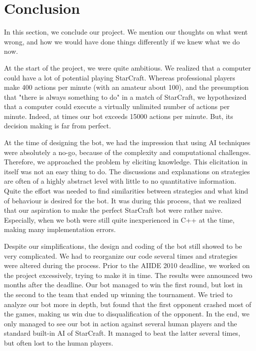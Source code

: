 
\chapter{Conclusion}
\label{chap:conclusion}

In this section, we conclude our project. We mention our thoughts on what went wrong, and how we would have done things differently if we knew what we do now.

At the start of the project, we were quite ambitious. We realized that a computer could have a lot of potential playing StarCraft. Whereas professional players make 400 actions per minute (with an amateur about 100), and the presumption that "there is always something to do" in a match of StarCraft, we hypothesized that a computer could execute a virtually unlimited number of actions per minute. Indeed, at times our bot exceeds 15000 actions per minute. But, its decision making is far from perfect. 

At the time of designing the bot, we had the impression that using AI techniques were absolutely a no-go, because of the complexity and computational challenges. Therefore, we approached the problem by eliciting knowledge. This elicitation in itself was not an easy thing to do. The discussions and explanations on strategies are often of a highly abstract level with little to no quantitative information. Quite the effort was needed to find similarities between strategies and what kind of behaviour is desired for the bot. It was during this process, that we realized that our aspiration to make the perfect StarCraft bot were rather naive. Especially, when we both were still quite inexperienced in C++ at the time, making many implementation errors.

Despite our simplifications, the design and coding of the bot still showed to be very complicated. We had to reorganize our code several times and strategies were altered during the process. Prior to the AIIDE 2010 deadline, we worked on the project excessively, trying to make it in time. The results were announced two months after the deadline. Our bot managed to win the first round, but lost in the second to the team that ended up winning the tournament. We tried to analyze our bot more in depth, but found that the first opponent crashed most of the games, making us win due to disqualification of the opponent. In the end, we only managed to see our bot in action against several human players and the standard built-in AI of StarCraft. It managed to beat the latter several times, but often lost to the human players.

